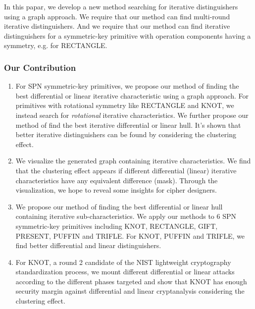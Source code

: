 In this papar, we develop a new method searching for iterative distinguishers using a graph approach. We require that our method can find multi-round iterative distinguishers. And we require that our method can find iterative distinguishers for a symmetric-key primitive with operation components having a symmetry, e.g. for RECTANGLE. 

\subsubsection{Our Contribution}
\begin{enumerate}
    \item For SPN symmetric-key primitives, we propose our method of finding the best differential or linear iterative characteristic using a graph approach. For primitives with rotational symmetry like RECTANGLE and KNOT, we instead search for \textit{rotational} iterative characteristics. We further propose our method of find the best iterative differential or linear hull. It's shown that better iterative distinguishers can be found by considering the clustering effect. 
    
    \item We visualize the generated graph containing iterative characteristics. We find that the clustering effect appears if different differential (linear) iterative characteristics have any equivalent difference (mask). Through the visualization, we hope to reveal some insights for cipher designers. 
    \item We propose our method of finding the best differential or linear hull containing iterative sub-characteristics. We apply our methods to 6 SPN symmetric-key primitives including KNOT, RECTANGLE, GIFT, PRESENT, PUFFIN and TRIFLE. For KNOT, PUFFIN and TRIFLE, we find better differential and linear distinguishers. 
    \item For KNOT, a round 2 candidate of the NIST lightweight cryptography standardization process, we mount different differential or linear attacks according to the different phases targeted and show that KNOT has enough security margin against differential and linear cryptanalysis considering the clustering effect. 
\end{enumerate}

